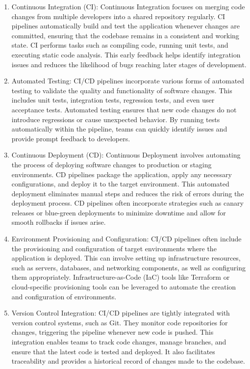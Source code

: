 \begin{enumerate}
    \item Continuous Integration (CI): Continuous Integration focuses on merging code changes from multiple developers into a shared repository regularly. CI pipelines automatically build and test the application whenever changes are committed, ensuring that the codebase remains in a consistent and working state. CI performs tasks such as compiling code, running unit tests, and executing static code analysis. This early feedback helps identify integration issues and reduces the likelihood of bugs reaching later stages of development.

    \item Automated Testing: CI/CD pipelines incorporate various forms of automated testing to validate the quality and functionality of software changes. This includes unit tests, integration tests, regression tests, and even user acceptance tests. Automated testing ensures that new code changes do not introduce regressions or cause unexpected behavior. By running tests automatically within the pipeline, teams can quickly identify issues and provide prompt feedback to developers.

    \item Continuous Deployment (CD): Continuous Deployment involves automating the process of deploying software changes to production or staging environments. CD pipelines package the application, apply any necessary configurations, and deploy it to the target environment. This automated deployment eliminates manual steps and reduces the risk of errors during the deployment process. CD pipelines often incorporate strategies such as canary releases or blue-green deployments to minimize downtime and allow for smooth rollbacks if issues arise.

    \item Environment Provisioning and Configuration: CI/CD pipelines often include the provisioning and configuration of target environments where the application is deployed. This can involve setting up infrastructure resources, such as servers, databases, and networking components, as well as configuring them appropriately. Infrastructure-as-Code (IaC) tools like Terraform or cloud-specific provisioning tools can be leveraged to automate the creation and configuration of environments.

    \item Version Control Integration: CI/CD pipelines are tightly integrated with version control systems, such as Git. They monitor code repositories for changes, triggering the pipeline whenever new code is pushed. This integration enables teams to track code changes, manage branches, and ensure that the latest code is tested and deployed. It also facilitates traceability and provides a historical record of changes made to the codebase.


\end{enumerate}
